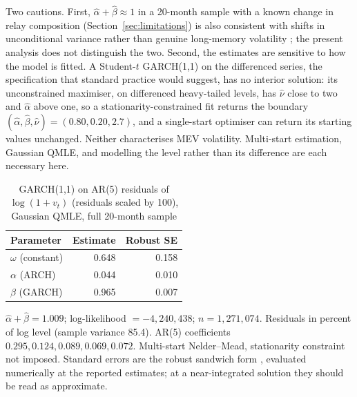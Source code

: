 \documentclass[11pt]{article}
\begin{document}
Two cautions. First, $\hat\alpha + \hat\beta \approx 1$ in a 20-month sample
with a known change in relay composition (Section~\ref{sec:limitations}) is
also consistent with shifts in unconditional variance rather than genuine
long-memory volatility \citep{lamoureux1990}; the present analysis does not
distinguish the two. Second, the estimates are sensitive to how the model is
fitted. A Student-$t$ GARCH(1,1) on the differenced series, the
specification that standard practice would suggest, has no interior
solution: its unconstrained maximiser, on differenced heavy-tailed levels,
has $\hat\nu$ close to two and $\hat\alpha$ above one, so a
stationarity-constrained fit returns the boundary
$(\hat\alpha, \hat\beta, \hat\nu) = (0.80, 0.20, 2.7)$, and a single-start
optimiser can return its starting values unchanged. Neither
characterises MEV volatility. Multi-start estimation, Gaussian QMLE, and
modelling the level rather than its difference are each necessary here.

\begin{table}[!htbp]
\centering
\caption{GARCH(1,1) on AR(5) residuals of $\log(1+v_t)$ (residuals scaled by 100), Gaussian QMLE, full 20-month sample}
\label{tab:garch}
\begin{tabular}{lrr}
\toprule
Parameter & Estimate & Robust SE \\
\midrule
$\omega$ (constant) & 0.648 & 0.158 \\
$\alpha$ (ARCH) & 0.044 & 0.010 \\
$\beta$ (GARCH) & 0.965 & 0.007 \\
\bottomrule
\end{tabular}

\smallskip
\footnotesize $\hat\alpha + \hat\beta = 1.009$; log-likelihood $= -4{,}240{,}438$; $n = 1{,}271{,}074$. Residuals in percent of log level (sample variance 85.4). AR(5) coefficients $0.295, 0.124, 0.089, 0.069, 0.072$. Multi-start Nelder--Mead, stationarity constraint not imposed. Standard errors are the robust sandwich form \citep{bollerslevwooldridge1992}, evaluated numerically at the reported estimates; at a near-integrated solution they should be read as approximate.
\end{table}
\end{document}
